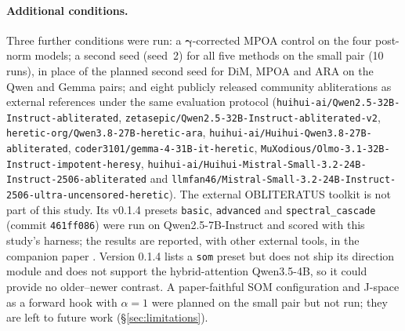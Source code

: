 {\raggedright
\paragraph{Additional conditions.} Three further conditions were run: a
$\boldsymbol{\gamma}$-corrected MPOA control on the four post-norm models; a
second seed (seed~2) for all five methods on the small pair (10 runs), in
place of the planned second seed for DiM, MPOA and ARA on the Qwen and Gemma
pairs; and eight publicly released community abliterations as external
references under the same evaluation protocol
(\texttt{huihui-ai/Qwen2.5-32B-Instruct-abliterated},
\texttt{zetasepic/Qwen2.5-32B-Instruct-abliterated-v2},
\texttt{heretic-org/Qwen3.8-27B-heretic-ara},
\texttt{huihui-ai/Huihui-Qwen3.8-27B-abliterated},
\texttt{coder3101/gemma-4-31B-it-heretic},
\texttt{MuXodious/Olmo-3.1-32B-Instruct-impotent-heresy},
\texttt{huihui-ai/Huihui-Mistral-Small-3.2-24B-Instruct-2506-abliterated} and
\texttt{llmfan46/Mistral-Small-3.2-24B-Instruct-2506-ultra-uncensored-heretic}).
The external OBLITERATUS toolkit \cite{obliteratus2026} is not part of this
study. Its v0.1.4 presets \texttt{basic}, \texttt{advanced} and
\texttt{spectral\_cascade} (commit \texttt{461ff086}) were run on
Qwen2.5-7B-Instruct and scored with this study's harness; the results are
reported, with other external tools, in the companion paper
\cite{young2026paper30}. Version 0.1.4 lists a \texttt{som} preset but does not
ship its direction module and does not support the hybrid-attention Qwen3.5-4B, so
it could provide no older--newer contrast. A paper-faithful SOM configuration
and J-space as a forward hook with $\alpha=1$ were planned on the small pair
but not run; they are left to future work (\S\ref{sec:limitations}).\par}

